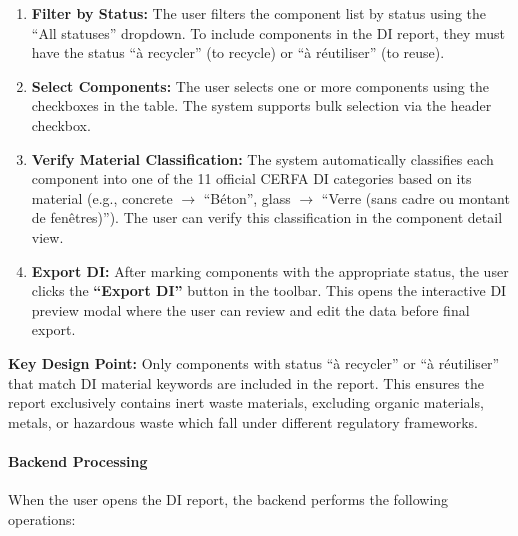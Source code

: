 \documentclass[11pt,a4paper]{article}
\begin{document}
\begin{enumerate}[leftmargin=*]
    \item \textbf{Filter by Status:} The user filters the component list by status using the ``All statuses'' dropdown. To include components in the DI report, they must have the status ``\`{a} recycler'' (to recycle) or ``\`{a} r\'{e}utiliser'' (to reuse).
    
    \item \textbf{Select Components:} The user selects one or more components using the checkboxes in the table. The system supports bulk selection via the header checkbox.
    
    \item \textbf{Verify Material Classification:} The system automatically classifies each component into one of the 11 official CERFA DI categories based on its material (e.g., concrete $\rightarrow$ ``B\'{e}ton'', glass $\rightarrow$ ``Verre (sans cadre ou montant de fen\^{e}tres)''). The user can verify this classification in the component detail view.
    
    \item \textbf{Export DI:} After marking components with the appropriate status, the user clicks the \textbf{``Export DI''} button in the toolbar. This opens the interactive DI preview modal where the user can review and edit the data before final export.
\end{enumerate}

\noindent\textbf{Key Design Point:} Only components with status ``\`{a} recycler'' or ``\`{a} r\'{e}utiliser'' that match DI material keywords are included in the report. This ensures the report exclusively contains inert waste materials, excluding organic materials, metals, or hazardous waste which fall under different regulatory frameworks.

\paragraph{Backend Processing}

When the user opens the DI report, the backend performs the following operations:
\end{document}
